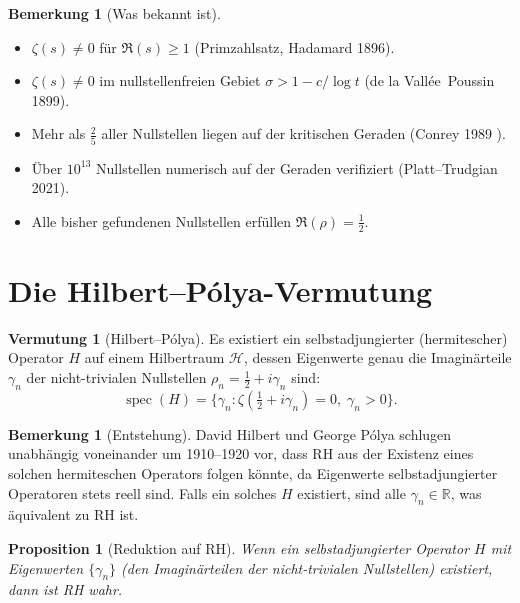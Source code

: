 \documentclass[12pt,a4paper]{amsart}
\newtheorem{proposition}[theorem]{Proposition}
\theoremstyle{definition}
\newtheorem{remark}[theorem]{Bemerkung}
\newtheorem{conjecture}[theorem]{Vermutung}
\newcommand{\R}{\mathbb{R}}
\DeclareMathOperator{\spec}{spec}
\begin{document}
\begin{remark}[Was bekannt ist]
\begin{itemize}
  \item $\zeta(s) \ne 0$ f\"ur $\Re(s) \ge 1$ (Primzahlsatz, Hadamard 1896).
  \item $\zeta(s) \ne 0$ im nullstellenfreien Gebiet $\sigma > 1 - c/\log t$
    (de la Vall\'ee~Poussin 1899).
  \item Mehr als $\tfrac{2}{5}$ aller Nullstellen liegen auf der kritischen
    Geraden (Conrey 1989 \cite{Conrey1989}).
  \item \"Uber $10^{13}$ Nullstellen numerisch auf der Geraden verifiziert
    (Platt--Trudgian 2021).
  \item Alle bisher gefundenen Nullstellen erf\"ullen $\Re(\rho) = \tfrac{1}{2}$.
\end{itemize}
\end{remark}

\section{Die Hilbert--P\'olya-Vermutung}

\begin{conjecture}[Hilbert--P\'olya]
\label{conj:hilbert_polya}
Es existiert ein selbstadjungierter (hermitescher) Operator $H$ auf
einem Hilbertraum $\mathcal{H}$, dessen Eigenwerte genau die
Imagin\"arteile $\gamma_n$ der nicht-trivialen Nullstellen
$\rho_n = \tfrac{1}{2} + i\gamma_n$ sind:
\[
  \spec(H) = \{\gamma_n : \zeta(\tfrac{1}{2} + i\gamma_n) = 0,\; \gamma_n > 0\}.
\]
\end{conjecture}

\begin{remark}[Entstehung]
David Hilbert und George P\'olya schlugen unabh\"angig voneinander um
1910--1920 vor, dass RH aus der Existenz eines solchen hermiteschen Operators
folgen k\"onnte, da Eigenwerte selbstadjungierter Operatoren stets reell sind.
Falls ein solches $H$ existiert, sind alle $\gamma_n \in \R$, was
\"aquivalent zu RH ist.
\end{remark}

\begin{proposition}[Reduktion auf RH]
Wenn ein selbstadjungierter Operator $H$ mit Eigenwerten $\{\gamma_n\}$
(den Imagin\"arteilen der nicht-trivialen Nullstellen) existiert,
dann ist RH wahr.
\end{proposition}
\end{document}
